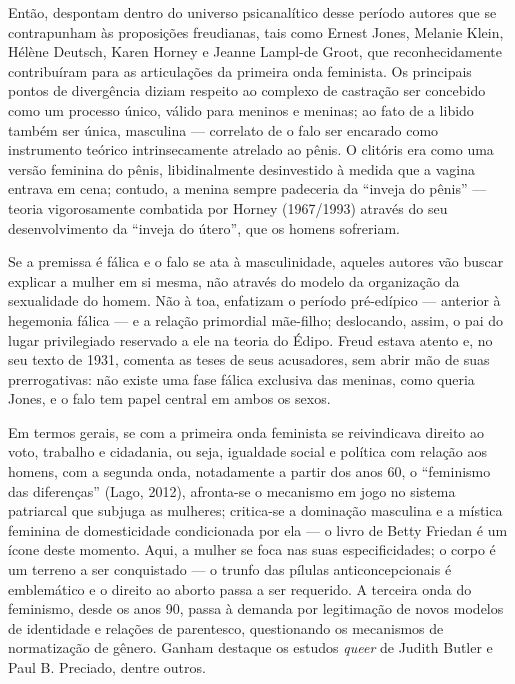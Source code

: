 Então, despontam dentro do universo psicanalítico desse período autores
que se contrapunham às proposições freudianas, tais como Ernest Jones,
Melanie Klein, Hélène Deutsch, Karen Horney e Jeanne Lampl-de Groot, que
reconhecidamente contribuíram para as articulações da primeira onda
feminista. Os principais pontos de divergência diziam respeito ao
complexo de castração ser concebido como um processo único, válido para
meninos e meninas; ao fato de a libido também ser única, masculina ---
correlato de o falo ser encarado como instrumento teórico
intrinsecamente atrelado ao pênis. O clitóris era como uma versão
feminina do pênis, libidinalmente desinvestido à medida que a vagina
entrava em cena; contudo, a menina sempre padeceria da ``inveja do
pênis'' --- teoria vigorosamente combatida por Horney (1967/1993)
através do seu desenvolvimento da ``inveja do útero'', que os homens
sofreriam.

Se a premissa é fálica e o falo se ata à masculinidade, aqueles autores
vão buscar explicar a mulher em si mesma, não através do modelo da
organização da sexualidade do homem. Não à toa, enfatizam o período
pré-edípico --- anterior à hegemonia fálica --- e a relação primordial
mãe-filho; deslocando, assim, o pai do lugar privilegiado reservado a
ele na teoria do Édipo. Freud estava atento e, no seu texto de 1931,
comenta as teses de seus acusadores, sem abrir mão de suas
prerrogativas: não existe uma fase fálica exclusiva das meninas, como
queria Jones, e o falo tem papel central em ambos os sexos.

Em termos gerais, se com a primeira onda feminista se reivindicava
direito ao voto, trabalho e cidadania, ou seja, igualdade social e
política com relação aos homens, com a segunda onda, notadamente a
partir dos anos 60, o ``feminismo das diferenças'' (Lago, 2012),
afronta-se o mecanismo em jogo no sistema patriarcal que subjuga as
mulheres; critica-se a dominação masculina e a mística feminina de
domesticidade condicionada por ela --- o livro de Betty Friedan é um
ícone deste momento. Aqui, a mulher se foca nas suas especificidades; o
corpo é um terreno a ser conquistado --- o trunfo das pílulas
anticoncepcionais é emblemático e o direito ao aborto passa a ser
requerido. A terceira onda do feminismo, desde os anos 90, passa à
demanda por legitimação de novos modelos de identidade e relações de
parentesco, questionando os mecanismos de normatização de gênero. Ganham
destaque os estudos \emph{queer} de Judith Butler e Paul B. Preciado,
dentre outros.


